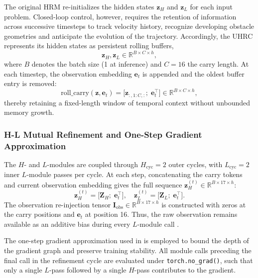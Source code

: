 \documentclass[12pt, a4paper]{article}
\begin{document}
The original HRM re-initializes the hidden states $\mathbf{z}_H$ and $\mathbf{z}_L$ for each input problem.
Closed-loop control, however, requires the retention of information across successive timesteps to track velocity history, recognize developing obstacle geometries and anticipate the evolution of the trajectory.
Accordingly, the UHRC represents its hidden states as persistent rolling buffers,
\begin{equation}
    \mathbf{z}_{H}, \mathbf{z}_{L} \in \mathbb{R}^{B \times C \times h},
\end{equation}
where $B$ denotes the batch size (1 at inference) and $C = 16$ the carry length.
At each timestep, the observation embedding $\mathbf{e}_t$ is appended and the oldest buffer entry is removed:
\begin{equation}
    \mathrm{roll\_carry}(\mathbf{z}, \mathbf{e}_t) =
        \bigl[\mathbf{z}_{:,1:C,:};\; \mathbf{e}_t^{\top}\bigr]
    \in \mathbb{R}^{B \times C \times h},
\end{equation}
thereby retaining a fixed-length window of temporal context without unbounded memory growth.


\subsubsection{H-L Mutual Refinement and One-Step Gradient Approximation}
\label{sec:hl_cycles}

The $H$- and $L$-modules are coupled through $H_\mathrm{cyc} = 2$ outer cycles, with $L_\mathrm{cyc} = 2$ inner $L$-module passes per cycle.
At each step, concatenating the carry tokens and current observation embedding gives the full sequence $\mathbf{z}_H^{(t)} \in \mathbb{R}^{B \times 17 \times h}$:
\begin{equation}
    \mathbf{z}_H^{(t)} = \bigl[\mathbf{Z}_H;\; \mathbf{e}_t^{\top}\bigr], \quad
    \mathbf{z}_L^{(t)} = \bigl[\mathbf{Z}_L;\; \mathbf{e}_t^{\top}\bigr].
\end{equation}
The observation re-injection tensor $\mathbf{I}_{\mathrm{obs}} \in \mathbb{R}^{B \times 17 \times h}$ is constructed with zeros at the carry positions and $\mathbf{e}_t$ at position 16.
Thus, the raw observation remains available as an additive bias during every $L$-module call \parencite{wang_hierarchical_2025}.

The one-step gradient approximation used in \textcite{wang_hierarchical_2025} is employed to bound the depth of the gradient graph and preserve training stability.
All module calls preceding the final call in the refinement cycle are evaluated under \texttt{torch.no\_grad()}, such that only a single $L$-pass followed by a single $H$-pass contributes to the gradient.
\end{document}
